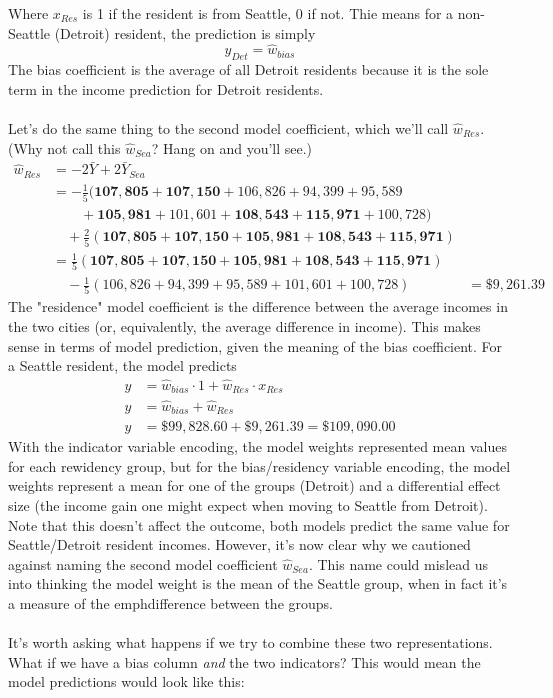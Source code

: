 Where $x_\mathit{Res}$ is 1 if the resident is from Seattle, 0 if not. Thie
means for a non-Seattle (Detroit) resident, the prediction is simply
\begin{equation}
y_\mathit{Det} = \hat{w}_\mathit{bias}
\end{equation}
The bias coefficient is the average of all Detroit residents because it is the
sole term in the income prediction for Detroit residents.\\
\\
Let's do the same thing to the second model coefficient, which we'll call
$\hat{w}_\mathit{Res}$. (Why not call this $\hat{w}_\mathit{Sea}$? Hang on and
you'll see.)
\begin{align}
\hat{w}_\mathit{Res} 
    &= -2 \bar{Y} + 2 \bar{Y}_\mathit{Sea} \\
    &= -\frac{1}{5}(\mathbf{107,805} + \mathbf{107,150} + 106,826 + 94,399 + 95,589 \\
    &\qquad + \mathbf{105,981} + 101,601 + \mathbf{108,543} + \mathbf{115,971} + 100,728)\\
    &\quad + \frac{2}{5}(\mathbf{107,805} + \mathbf{107,150} + \mathbf{105,981} +
                   \mathbf{108,543} + \mathbf{115,971})\\
    &= \frac{1}{5}(\mathbf{107,805} + \mathbf{107,150} + \mathbf{105,981} +
                   \mathbf{108,543} + \mathbf{115,971})\\
    &\quad -\frac{1}{5}(106,826 + 94,399 + 95,589 + 101,601 + 100,728) 
    &= \$9,261.39
\end{align}
The "residence" model coefficient is the difference between the average incomes
in the two cities (or, equivalently, the average difference in income).  This
makes sense in terms of model prediction, given the meaning of the bias
coefficient.  For a Seattle resident, the model predicts
\begin{align}
y &= \hat{w}_\mathit{bias} \cdot 1 + \hat{w}_\mathit{Res} \cdot x_\mathit{Res}\\
y &= \hat{w}_\mathit{bias} + \hat{w}_\mathit{Res}\\
y &= \$99,828.60 + \$9,261.39 = \$109,090.00 
\end{align}
With the indicator variable encoding, the model weights represented mean values
for each rewidency group, but for the bias/residency variable encoding, the
model weights represent a mean for one of the groups (Detroit) and a
differential effect size (the income gain one might expect when moving to
Seattle from Detroit). Note that this doesn't affect the outcome, both models
predict the same value for Seattle/Detroit resident incomes.  However, it's
now clear why we cautioned against naming the second model coefficient
$\hat{w}_\mathit{Sea}$.  This name could mislead us into thinking the model
weight is the mean of the Seattle group, when in fact it's a measure of the
emph{difference} between the groups. \\
\\
It's worth asking what happens if we try to combine these two representations.
What if we have a bias column \emph{and} the two indicators? This would mean the
model predictions would look like this:

